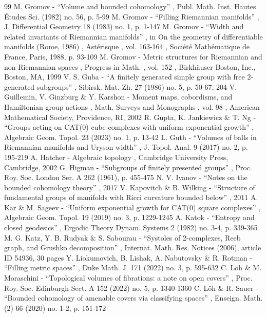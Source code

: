 \documentclass[10pt]{amsart}
\theoremstyle{definition}
\begin{document}
\begin{thebibliography}{99}
 M. Gromov - “Volume and bounded cohomology” , Publ. Math. Inst. Hautes Études Sci. (1982) no. 56, p. 5-99
 M. Gromov - “Filling Riemannian manifolds” , J. Differential Geometry 18 (1983) no. 1, p. 1-147
 M. Gromov - “Width and related invariants of Riemannian manifolds” , in On the geometry of differentiable manifolds (Rome, 1986) , Astérisque , vol. 163-164 , Société Mathématique de France, Paris, 1988, p. 93-109
 M. Gromov - Metric structures for Riemannian and non-Riemannian spaces , Progress in Math. , vol. 152 , Birkhäuser Boston, Inc., Boston, MA, 1999
 V. S. Guba - “A finitely generated simple group with free $2$-generated subgroups” , Sibirsk. Mat. Zh. 27 (1986) no. 5, p. 50-67, 204
 V. Guillemin, V. Ginzburg \& Y. Karshon - Moment maps, cobordisms, and Hamiltonian group actions , Math. Surveys and Monographs , vol. 98 , American Mathematical Society, Providence, RI, 2002
 R. Gupta, K. Jankiewicz \& T. Ng - “Groups acting on CAT(0) cube complexes with uniform exponential growth” , Algebraic Geom. Topol. 23 (2023) no. 1, p. 13-42
 L. Guth - “Volumes of balls in Riemannian manifolds and Uryson width” , J. Topol. Anal. 9 (2017) no. 2, p. 195-219
 A. Hatcher - Algebraic topology , Cambridge University Press, Cambridge, 2002
 G. Higman - “Subgroups of finitely presented groups” , Proc. Roy. Soc. London Ser. A 262 (1961), p. 455-475
 N. V. Ivanov - “Notes on the bounded cohomology theory” , 2017
 V. Kapovitch \& B. Wilking - “Structure of fundamental groups of manifolds with Ricci curvature bounded below” , 2011
 A. Kar \& M. Sageev - “Uniform exponential growth for CAT(0) square complexes” , Algebraic Geom. Topol. 19 (2019) no. 3, p. 1229-1245
 A. Katok - “Entropy and closed geodesics” , Ergodic Theory Dynam. Systems 2 (1982) no. 3-4, p. 339-365
 M. G. Katz, Y. B. Rudyak \& S. Sabourau - “Systoles of 2-complexes, Reeb graph, and Grushko decomposition” , Internat. Math. Res. Notices (2006), article ID 54936, 30 pages
 Y. Liokumovich, B. Lishak, A. Nabutovsky \& R. Rotman - “Filling metric spaces” , Duke Math. J. 171 (2022) no. 3, p. 595-632
 C. Löh \& M. Moraschini - “Topological volumes of fibrations: a note on open covers” , Proc. Roy. Soc. Edinburgh Sect. A 152 (2022) no. 5, p. 1340-1360
 C. Löh \& R. Sauer - “Bounded cohomology of amenable covers via classifying spaces” , Enseign. Math. (2) 66 (2020) no. 1-2, p. 151-172

\end{thebibliography}
\end{document}
